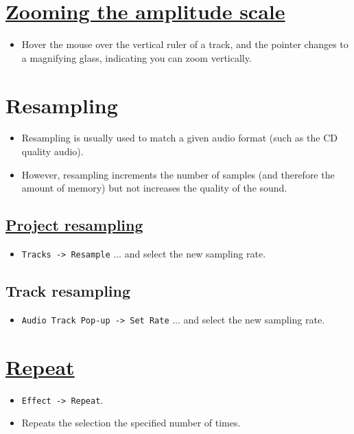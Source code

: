 \section{\href{http://manual.audacityteam.org/o/man/zooming.html}{Zooming the amplitude scale}}
\begin{itemize}
\item Hover the mouse over the vertical ruler of a track, and the
  pointer changes to a magnifying glass, indicating you can zoom
  vertically.
\end{itemize}


\section{Resampling}

\begin{itemize}
\item Resampling is usually used to match a given audio format (such
  as the CD quality audio).
\item However, resampling increments the number of samples (and
  therefore the amount of memory) but not increases the quality of the
  sound.
\end{itemize}

\subsection{\href{http://manual.audacityteam.org/o/man/tracks_menu.html\#mix}{Project resampling}}
\begin{itemize}
\item \verb|Tracks -> Resample| ...  and select the new sampling rate.
\end{itemize}

\subsection{Track resampling}
\begin{itemize}
\item \verb|Audio Track Pop-up -> Set Rate| ... and select the new sampling rate.
\end{itemize}

\section{\href{http://manual.audacityteam.org/o/man/repeat.html}{Repeat}}
\begin{itemize}
\item \verb|Effect -> Repeat|.
\item Repeats the selection the specified number of times. 
\end{itemize}

